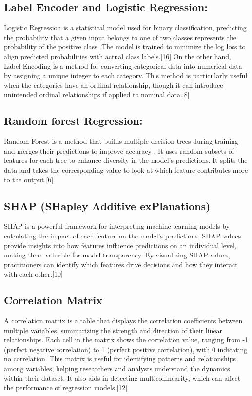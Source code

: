 \documentclass[conference]{IEEEtran}
\begin{document}
\subsection{Label Encoder and Logistic Regression:}
Logistic Regression is a statistical model used for binary
classification, predicting the probability that a given input belongs to one of two classes represents the probability of the positive class. The model is trained to minimize the log loss to align predicted probabilities with actual class labels.[16]
On the other hand, Label Encoding is a method for converting categorical data into numerical data by assigning a unique integer to each category. This method is particularly useful when the categories have an ordinal relationship, though it can introduce unintended ordinal relationships if applied to nominal data.[8]
\subsection{Random forest Regression:}
Random Forest is a method that builds multiple decision trees during training and merges their predictions to improve accuracy . It uses random subsets of features for each tree to enhance diversity  in the model's predictions. It splits the data and takes the corresponding value to look at which feature contributes more to the output.[6]
\subsection{SHAP (SHapley Additive exPlanations)}\label{SCM}
SHAP is a powerful framework for interpreting machine learning models by calculating the impact of each feature on the model's predictions. SHAP values provide insights into how features influence predictions on an individual level, making them valuable for model transparency. By visualizing SHAP values, practitioners can identify which features drive decisions and how they interact with each other.[10]
\subsection{Correlation Matrix}
A correlation matrix is a table that displays the correlation coefficients between multiple variables, summarizing the strength and direction of their linear relationships. Each cell in the matrix shows the correlation value, ranging from -1 (perfect negative correlation) to 1 (perfect positive correlation), with 0 indicating no correlation. This matrix is useful for identifying patterns and relationships among variables, helping researchers and analysts understand the dynamics within their dataset. It also aids in detecting multicollinearity, which can affect the performance of regression models.[12]
\end{document}
